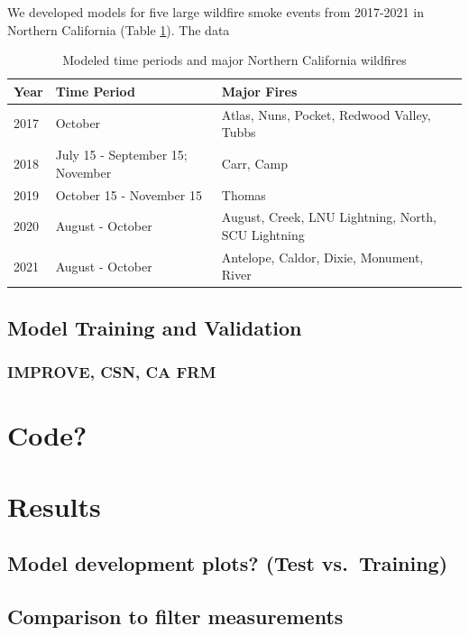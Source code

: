 \documentclass[gmd, manuscript]{copernicus}
\begin{document}
We developed models for five large wildfire smoke events from 2017-2021
in Northern California (Table \ref{table:2}). The data

\begin{table}[h]
\caption{Modeled time periods and major Northern California wildfires}
\begin{tabular}{lll}
Year & Time Period              & Major Fires                                        \\ \hline
2017 & October                  & Atlas, Nuns, Pocket, Redwood Valley, Tubbs         \\
2018 & July 15 - September 15; November   & Carr, Camp                               \\
2019 & October 15 - November 15 & Thomas                                             \\
2020 & August - October         & August, Creek, LNU Lightning, North, SCU Lightning \\
2021 & August - October         & Antelope, Caldor, Dixie, Monument, River          
\end{tabular}
\label{table:2}
\end{table}

\subsection{Model Training and Validation}

\subsubsection{IMPROVE, CSN, CA FRM}

\section{Code?}

\section{Results}

\subsection{Model development plots? (Test vs.~Training)}

\subsection{Comparison to filter measurements}
\end{document}
